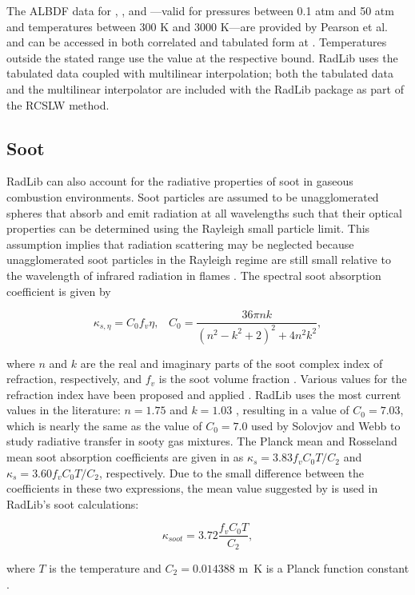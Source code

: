 \documentclass[preprint,12pt]{elsarticle}
\begin{document}
The ALBDF data for , , and ---valid for pressures between 0.1 atm and 50 atm and temperatures between 300 K and 3000 K---are provided by Pearson et al. \cite{Pearson_2014} and can be accessed in both correlated and tabulated form at \cite{Solovjov_2014b}. Temperatures outside the stated range use the value at the respective bound. RadLib uses the tabulated data coupled with multilinear interpolation; both the tabulated data and the multilinear interpolator are included with the RadLib package as part of the RCSLW method.


\subsection{Soot} \label{s:soot}

RadLib can also account for the radiative properties of soot in gaseous combustion environments. Soot particles are assumed to be unagglomerated spheres that absorb and emit radiation at all wavelengths such that their optical properties can be determined using the Rayleigh small particle limit. This assumption implies that radiation scattering may be neglected because unagglomerated soot particles in the Rayleigh regime are still small relative to the wavelength of infrared radiation in flames \cite{Brewster_1992,Solovjov_2001}. The spectral soot absorption coefficient is given by 
%
\begin{linenomath}
\begin{equation}
\label{e:soot1}
	\kappa_{s,\eta}=C_0 f_v \eta, \; \; \; C_0 = \frac{36\pi n k}{(n^2-k^2+2)^2+4n^2k^2},
\end{equation}
\end{linenomath}
%
where $n$ and $k$ are the real and imaginary parts of the soot complex index of refraction, respectively, and $f_v$ is the soot volume fraction \cite{Solovjov_2001,Modest_2013}. Various values for the refraction index have been proposed and applied \cite{Lee_1981,Stull_1960,Dalzell_1969,Howarth_1966,Chang_1990,Felske_1984,Williams_2007}. 
RadLib uses the most current values in the literature: $n=1.75$ and $k=1.03$ \cite{Williams_2007}, resulting in a value of $C_0=7.03$, which is nearly the same as the value of $C_0=7.0$ used by Solovjov and Webb \cite{Solovjov_2001} to study radiative transfer in sooty gas mixtures. 
The Planck mean and Rosseland mean soot absorption coefficients are given in \cite{Modest_2013} as $\kappa_s=3.83f_vC_0T/C_2$ and $\kappa_s=3.60f_vC_0T/C_2$, respectively.
Due to the small difference between the coefficients in these two expressions, the mean value suggested by \cite{Modest_2013,Felske_1977} is used in RadLib's soot calculations:
%
\begin{linenomath}
\begin{equation}
\label{e:soot2}
	\kappa_{soot}=3.72\frac{f_vC_0T}{C_2},
\end{equation}
\end{linenomath}
%
where $T$ is the temperature and $C_2=0.014388$ \si{m.K} is a Planck function constant \cite{Modest_2013}. 
\end{document}
